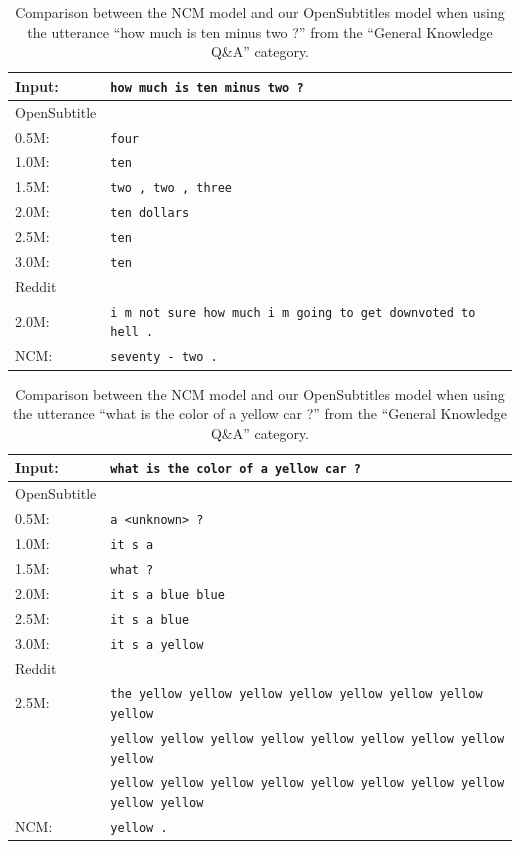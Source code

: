 \begin{table}[H]
	\centering
	\begin{adjustbox}{max width=\textwidth}
		\begin{tabular}{ll}
			\toprule
			Input: 	& \texttt{how much is ten minus two ?}\\
			\midrule
			OpenSubtitle\\
			0.5M: 	& \texttt{four}\\
			1.0M: 	& \texttt{ten}\\
			1.5M:	& \texttt{two , two , three}\\
			2.0M:	& \texttt{ten dollars}\\
			2.5M:	& \texttt{ten}\\
			3.0M:	& \texttt{ten}\\
			\midrule
			Reddit\\
			2.0M:	& \texttt{i m not sure how much i m going to get downvoted to hell .}\\
			\midrule
			NCM:	& \texttt{seventy - two .}\\
			\bottomrule
		\end{tabular}
	\end{adjustbox}
	\caption{Comparison between the NCM model and our OpenSubtitles model when using the utterance ``how much is ten minus two ?'' from the ``General Knowledge Q\&A'' category.}
	\label{results:example11_output:Neural_Conversational_Model_compared}
\end{table}
\begin{table}[H]
	\centering
	\begin{adjustbox}{max width=\textwidth}
		\begin{tabular}{ll}
			\toprule
			Input: 	& \texttt{what is the color of a yellow car ?}\\
			\midrule
			OpenSubtitle\\
			0.5M: 	& \texttt{a <unknown> ?}\\
			1.0M: 	& \texttt{it s a}\\
			1.5M:	& \texttt{what ?}\\
			2.0M:	& \texttt{it s a blue blue}\\
			2.5M:	& \texttt{it s a blue}\\
			3.0M:	& \texttt{it s a yellow}\\
			\midrule
			Reddit\\
			2.5M:	& \texttt{the yellow yellow yellow yellow yellow yellow yellow yellow}\\
					& \texttt{yellow yellow yellow yellow yellow yellow yellow yellow yellow}\\
					& \texttt{yellow yellow yellow yellow yellow yellow yellow yellow yellow yellow}\\
					\midrule
			NCM:	& \texttt{yellow .}\\
			\bottomrule
		\end{tabular}
	\end{adjustbox}
	\caption{Comparison between the NCM model and our OpenSubtitles model when using the utterance ``what is the color of a yellow car ?'' from the ``General Knowledge Q\&A'' category.}
	\label{results:example12_output:Neural_Conversational_Model_compared}
\end{table}
